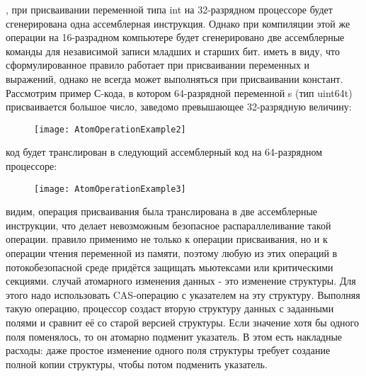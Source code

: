 {	, при присваивании переменной типа int на 32-разрядном процессоре будет сгенерирована одна ассемблерная инструкция. Однако при компиляции этой же операции на 16-разрадном компьютере будет сгенерировано две ассемблерные команды для независимой записи младших и старших бит.
	 иметь в виду, что сформулированное правило работает при присваивании переменных и выражений, однако не всегда может выполняться при присваивании констант. Рассмотрим пример С-кода, в котором 64-разрядной переменной s (тип uint64\textunderscore t) присваивается большое число, заведомо превышающее 32-разрядную величину:
	\begin{figure}[H]
		\texttt{[image: AtomOperationExample2]}
	\end{figure}
	 код будет транслирован в следующий ассемблерный код на 64-разрядном процессоре:
	\begin{figure}[H]
		\texttt{[image: AtomOperationExample3]}
	\end{figure}
	 видим, операция присваивания была транслирована в две ассемблерные инструкции, что делает невозможным безопасное распараллеливание такой операции.
	 правило применимо не только к операции присваивания, но и к операции чтения переменной из памяти, поэтому любую из этих операций в потокобезопасной среде придётся защищать мьютексами или критическими секциями.
	 случай атомарного изменения данных - это изменение структуры. Для этого надо использовать CAS-операцию с указателем на эту структуру. Выполняя такую операцию, процессор создаст вторую структуру данных с заданными полями и сравнит её со старой версией структуры. Если значение хотя бы одного поля поменялось, то он атомарно подменит указатель. В этом есть накладные расходы: даже простое изменение одного поля структуры требует создание полной копии структуры, чтобы потом подменить указатель.
	\par
}